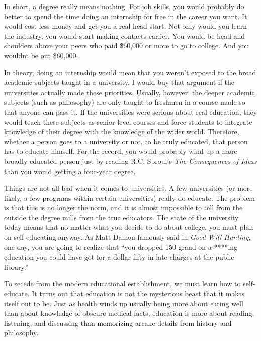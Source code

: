 \documentclass[letterpaper]{article}
\begin{document}
{\color{black}
In short, a degree really means nothing. For job skills, you would
probably do better to spend the time doing an internship for free in
the career you want. It would cost less money and get you a real head
start. Not only would you learn the industry, you would start making
contacts earlier. You would be head and shoulders above your peers who
paid \$60,000 or more to go to college.  And you
wouldn{\textquotesingle}t be out \$60,000.}

{\color{black}
In theory, doing an internship would mean that you weren’t exposed to
the broad academic subjects taught in a university. I would buy that
argument if the universities actually made these priorities. Usually,
however, the deeper academic subjects (such as philosophy) are only
taught to freshmen in a course made so that anyone can pass it. If the
universities were serious about real education, they would teach these
subjects as senior-level courses and force
\textcolor[rgb]{0.32941177,0.5529412,0.83137256}{students} to integrate
knowledge of \textcolor[rgb]{0.32941177,0.5529412,0.83137256}{their}
degree with the knowledge of the wider world. Therefore, whether
\textcolor[rgb]{0.32941177,0.5529412,0.83137256}{a person goes} to a
university or not, to be truly educated,
\textcolor[rgb]{0.32941177,0.5529412,0.83137256}{that person
has}\textcolor[rgb]{0.32941177,0.5529412,0.83137256}{ }to educate
\textcolor[rgb]{0.32941177,0.5529412,0.83137256}{himself}.
\textcolor[rgb]{0.32941177,0.5529412,0.83137256}{For the record, y}ou
would probably wind up a more broadly educated person just by reading
R.C. Sproul’s \textit{The Consequences of Ideas} than you would getting
a four-year degree. }

{\color{black}
Things are not all bad when it comes to universities. A few universities
(or more likely, a few programs within certain universities) really do
educate. The problem is that this is no longer the norm, and it is
almost impossible to tell from the outside the degree mills from the
true educators. The state of the university today means that no matter
what you decide to do about college, you must plan on self-educating
anyway. As Matt Damon famously said in \textit{Good Will Hunting}, one
day, you are going to realize that “you dropped 150 grand on a ****ing
education you could have got for a dollar fifty in late charges at the
public library.”}

{\color{black}
To secede from the modern educational establishment, we must learn how
to self-educate. It turns out that education is not the mysterious
beast that it makes itself out to be. Just as health winds up usually
being more about eating well than about knowledge of obscure medical
facts, education is more about reading, listening, and discussing than
memorizing arcane details from history and philosophy.}
\end{document}
